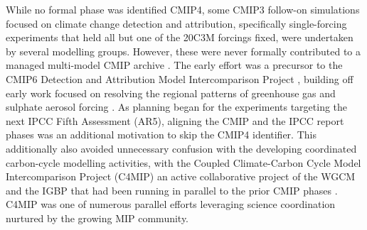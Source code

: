 \documentclass[gmd, preprint]{copernicus}
\newcommand{\mycomment}[1]{}
\begin{document}
While no formal phase was identified CMIP4, some CMIP3 follow-on simulations focused on climate change detection and attribution, specifically single-forcing experiments that held all but one of the 20C3M forcings fixed, were undertaken by several modelling groups. However, these were never formally contributed to a managed multi-model CMIP archive \citep{stouffer_cmip5_2017}. The early effort was a precursor to the CMIP6 Detection and Attribution Model Intercomparison Project \citep[DAMIP;][]{gillett_detection_2016}, building off early work focused on resolving the regional patterns of greenhouse gas and sulphate aerosol forcing \citep{taylor_response_1994, santer_towards_1995, hegerl_optimal_2000, gillett_detecting_2002, hegerl_20c3m_2003}. As planning began for the experiments targeting the next IPCC Fifth Assessment (AR5), aligning the CMIP and the IPCC report phases was an additional motivation to skip the CMIP4 identifier. This additionally also avoided unnecessary confusion with the developing coordinated carbon-cycle modelling activities, with the Coupled Climate-Carbon Cycle Model Intercomparison Project (C4MIP) an active collaborative project of the WGCM and the IGBP that had been running in parallel to the prior CMIP phases \citep{fung_full-form_2000, cox_modelling_2002, friedlingstein_climatecarbon_2006}. C4MIP was one of numerous parallel efforts leveraging science coordination nurtured by the growing MIP community.
\mycomment{
CMIP4 comment - https://www.wcrp-climate.org/images/modelling/WGCM/WGCM17/WGCM17_report.pdf#Page=8
}
\end{document}
